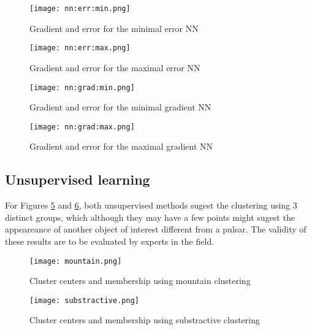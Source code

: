 \begin{figure*}[ht]
    \begin{subfigure}[t]{0.49\linewidth}
        \texttt{[image: nn:err:min.png]}
        \caption{Gradient and error for the minimal error NN
        \label{fig:nn:err:min}}
    \end{subfigure}
    \hfill
    \begin{subfigure}[t]{0.49\linewidth}
        \texttt{[image: nn:err:max.png]}
        \caption{Gradient and error for the maximal error NN
        \label{fig:nn:err:max}}
    \end{subfigure}
    
    \begin{subfigure}[b]{0.49\linewidth}
        \texttt{[image: nn:grad:min.png]}
        \caption{Gradient and error for the minimal gradient NN
        \label{fig:nn:grad:min}}
    \end{subfigure}
    \hfill
    \begin{subfigure}[b]{0.49\linewidth}
        \texttt{[image: nn:grad:max.png]}
        \caption{Gradient and error for the maximal gradient NN
        \label{fig:nn:grad:max}}
    \end{subfigure}
    \caption{Gradient and error of the most notable NN obtained 
        \label{fig:nn}}
\end{figure*}

\subsection{Unsupervised learning}
For Figures \ref{fig:mountain} and \ref{fig:substractive}, both unsupervised
methods sugest the clustering using 3 distinct groups, which although they may
have a few points might sugest the appeareance of another object of interest
different from a pulsar. The validity of these results are to be evaluated by
experts in the field.

\begin{figure}[t]
    \texttt{[image: mountain.png]}
    \caption{Cluster centers and membership using mountain clustering
    \label{fig:mountain}}
\end{figure}
\begin{figure}[t]
    \texttt{[image: substractive.png]}
    \caption{Cluster centers and membership using substractive clustering
    \label{fig:substractive}}
\end{figure}


